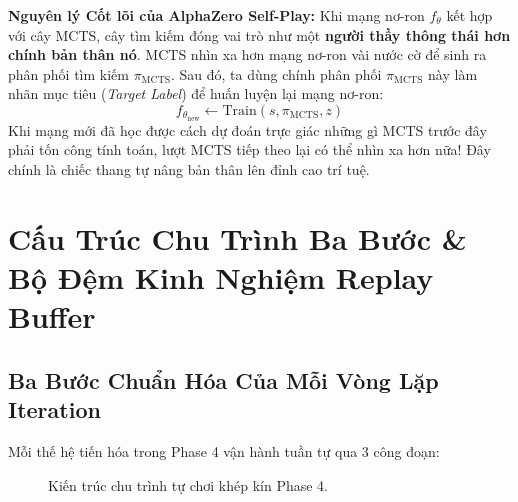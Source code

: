 \documentclass[12pt,a4paper,oneside]{report}
\begin{document}
\begin{pedagogy}
\textbf{Nguyên lý Cốt lõi của AlphaZero Self-Play:}
Khi mạng nơ-ron $f_\theta$ kết hợp với cây MCTS, cây tìm kiếm đóng vai trò như một \textbf{người thầy thông thái hơn chính bản thân nó}. MCTS nhìn xa hơn mạng nơ-ron vài nước cờ để sinh ra phân phối tìm kiếm $\pi_{\text{MCTS}}$. 
Sau đó, ta dùng chính phân phối $\pi_{\text{MCTS}}$ này làm nhãn mục tiêu (\textit{Target Label}) để huấn luyện lại mạng nơ-ron:
\begin{equation}
    f_{\theta_{\text{new}}} \leftarrow \text{Train}(s, \pi_{\text{MCTS}}, z)
\end{equation}
Khi mạng mới đã học được cách dự đoán trực giác những gì MCTS trước đây phải tốn công tính toán, lượt MCTS tiếp theo lại có thể nhìn xa hơn nữa! Đây chính là chiếc thang tự nâng bản thân lên đỉnh cao trí tuệ.
\end{pedagogy}

\chapter{Cấu Trúc Chu Trình Ba Bước \& Bộ Đệm Kinh Nghiệm Replay Buffer}

\section{Ba Bước Chuẩn Hóa Của Mỗi Vòng Lặp Iteration}

Mỗi thế hệ tiến hóa trong Phase 4 vận hành tuần tự qua 3 công đoạn:

\begin{figure}[htbp]
\centering
{}
\caption{Kiến trúc chu trình tự chơi khép kín Phase 4.}
\end{figure}
\end{document}

